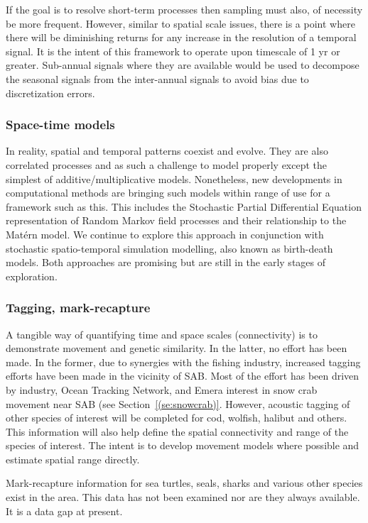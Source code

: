 \documentclass[letterpaper,portrait,11pt]{scrartcl}
\numberwithin{equation}{section}		%
\numberwithin{figure}{section}		%
\numberwithin{table}{section}				%
\begin{document}
If the goal is to resolve short-term processes then sampling must also, of necessity be more frequent. However, similar to spatial scale issues, there is a point where there will be diminishing returns for any increase in the resolution of a temporal signal. It is the intent of this framework to operate upon timescale of 1 yr or greater. Sub-annual signals where they are available would be used to decompose the seasonal signals from the inter-annual signals to avoid bias due to discretization errors. 

\subsubsection{Space-time models}

In reality, spatial and temporal patterns coexist and evolve. They are also correlated processes and as such a challenge to model properly except the simplest of additive/multiplicative models. Nonetheless, new developments in computational methods are bringing such models within range of use for a framework such as this. This includes the Stochastic Partial Differential Equation representation of Random Markov field processes and their relationship to the Mat\'{e}rn model. We continue to explore this approach in conjunction with stochastic spatio-temporal simulation modelling, also known as birth-death models. Both approaches are promising but are still in the early stages of exploration.


\subsubsection{Tagging, mark-recapture}

A tangible way of quantifying time and space scales (connectivity) is to demonstrate movement and genetic similarity. In the latter, no effort has been made.  In the former, due to synergies with the fishing industry, increased tagging efforts have been made in the vicinity of SAB. Most of the effort has been driven by industry, Ocean Tracking Network, and Emera interest in snow crab movement near SAB (see Section~\ref{(se:snowcrab)}. However, acoustic tagging of other species of interest will be completed for cod, wolfish, halibut and others. This information will also help define the spatial connectivity and range of the species of interest. The intent is to develop movement models where possible and estimate spatial range directly.  

Mark-recapture information for sea turtles, seals, sharks and various other species exist in the area. This data has not been examined nor are they always available. It is a data gap at present. 
\end{document}
